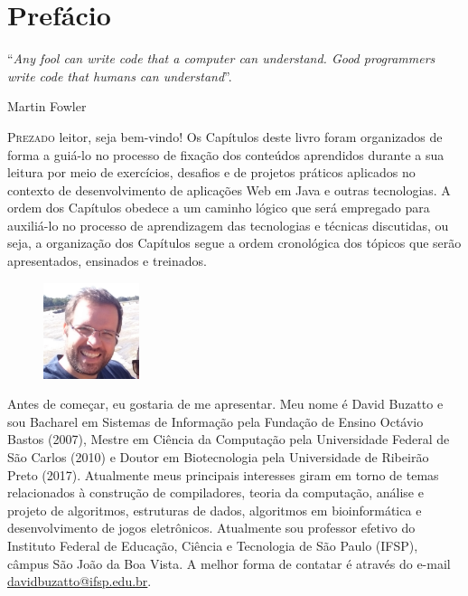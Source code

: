 \chapter*{Prefácio}
\epigraph{``\textit{Any fool can write code that a computer can understand. Good programmers write code that humans can understand}''.}{Martin Fowler}

\lettrine[lines=4, lhang=0.1, lraise=0, loversize=0.2, findent=0.1em]{\textcolor{corTema}{P}}{rezado} leitor, seja bem-vindo! Os Capítulos deste livro foram organizados de forma a guiá-lo no processo de fixação dos conteúdos aprendidos durante a sua leitura por meio de exercícios, desafios e de projetos práticos aplicados no contexto de desenvolvimento de aplicações Web em Java e outras tecnologias. A ordem dos Capítulos obedece a um caminho lógico que será empregado para auxiliá-lo no processo de aprendizagem das tecnologias e técnicas discutidas, ou seja, a organização dos Capítulos segue a ordem cronológica dos tópicos que serão apresentados, ensinados e treinados.

\begin{figure}
    \centering
    \includegraphics[width=0.25\textwidth]{imagens/david}
\end{figure}

Antes de começar, eu gostaria de me apresentar. Meu nome é David Buzatto e sou Bacharel em Sistemas de Informação pela Fundação de Ensino Octávio Bastos (2007), Mestre em Ciência da Computação pela Universidade Federal de São Carlos (2010) e Doutor em Biotecnologia pela Universidade de Ribeirão Preto (2017). Atualmente meus principais interesses giram em torno de temas relacionados à construção de compiladores, teoria da computação, análise e projeto de algoritmos, estruturas de dados, algoritmos em bioinformática e desenvolvimento de jogos eletrônicos. Atualmente sou professor efetivo do Instituto Federal de Educação, Ciência e Tecnologia de São Paulo (IFSP), câmpus São João da Boa Vista. A melhor forma de contatar é através do e-mail \textcolor{corTema}{\href{mailto:davidbuzatto@ifsp.edu.br}{davidbuzatto@ifsp.edu.br}}.

